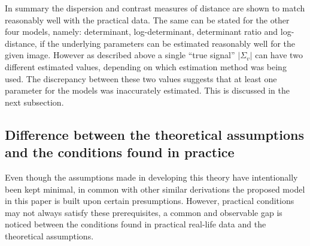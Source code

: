 \documentclass[journal]{IEEEtran}
\begin{document}
In summary the dispersion and contrast measures of distance are shown to match reasonably well with the practical data.
The same can be stated for the other four models, namely: determinant, log-determinant, determinant ratio and log-distance,
  if the underlying parameters can be estimated reasonably well for the given image.   
However as described above a single ``true signal'' $|\Sigma_v|$ can have two different estimated values,
  depending on which estimation method was being used.
The discrepancy between these two values suggests that at least one parameter for the models was inaccurately estimated.
This is discussed in the next subsection.


\subsection{Difference between the theoretical assumptions and the conditions found in practice}  
\label{sec:improve_the_match_bw_theory_practice}

Even though the assumptions made in developing this theory have intentionally been kept minimal, 
in common with other similar derivations the proposed model in this paper is built upon certain presumptions.
However, practical conditions may not always satisfy these prerequisites,
  a common and observable gap is noticed between the conditions found in practical real-life data and the theoretical assumptions.
\end{document}
